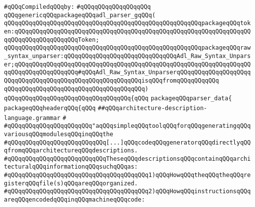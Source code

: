 \label{src/lib/compiler/back/low/tools/parser/architecture-description-language.grammar.pkg}
\newline
\verb|#qQQqCompiledqQQqby:|\newline
\verb|#qQQqqQQqqQQqqQQqqQQq|\newline
\newline
\verb|qQQqgenericqQQqpackageqQQqadl_parser_gqQQq(|\newline
\verb|qQQqqQQqqQQqqQQqqQQqqQQqqQQqqQQqqQQqqQQqqQQqqQQqqQQqqQQqpackageqQQqtoken:qQQqqQQqqQQqqQQqqQQqqQQqqQQqqQQqqQQqqQQqqQQqqQQqqQQqqQQqqQQqqQQqqQQqqQQqqQQqqQQqqQQqqQQqToken;|\newline
\verb|qQQqqQQqqQQqqQQqqQQqqQQqqQQqqQQqqQQqqQQqqQQqqQQqqQQqqQQqpackageqQQqraw_syntax_unparser:qQQqqQQqqQQqqQQqqQQqqQQqqQQqqQQqAdl_Raw_Syntax_Unparser;qQQqqQQqqQQqqQQqqQQqqQQqqQQqqQQqqQQqqQQqqQQqqQQqqQQqqQQqqQQqqQQqqQQqqQQqqQQqqQQqqQQqqQQq#qQQqAdl_Raw_Syntax_UnparserqQQqqQQqqQQqqQQqqQQqqQQqqQQqqQQqqQQqqQQqqQQqqQQqqQQqqQQqqQQqisqQQqfromqQQqqQQqqQQq|\newline
\verb|qQQqqQQqqQQqqQQqqQQqqQQqqQQqqQQqqQQqqQQq)|\newline
\verb|qQQqqQQqqQQqqQQqqQQqqQQqqQQqqQQqqQQq{qQQq|\newline
\verb|packageqQQqparser_data{|\newline
\verb|packageqQQqheaderqQQq{qQQq|\newline
\verb|##qQQqarchitecture-description-language.grammar|\newline
\verb|#|\newline
\verb|#qQQqqQQqqQQqqQQqqQQqqQQq"aqQQqsimpleqQQqtoolqQQqforqQQqgeneratingqQQqvariousqQQqmodulesqQQqinqQQqthe|\newline
\verb|#qQQqqQQqqQQqqQQqqQQqqQQqqQQq[...]qQQqcodeqQQqgeneratorqQQqdirectlyqQQqfromqQQqarchitectureqQQqdescriptions.|\newline
\verb|#qQQqqQQqqQQqqQQqqQQqqQQqqQQqTheseqQQqdescriptionsqQQqcontainqQQqarchitecturalqQQqinformationqQQqsuchqQQqas:|\newline
\verb|#qQQqqQQqqQQqqQQqqQQqqQQqqQQqqQQqqQQqqQQq1)qQQqHowqQQqtheqQQqtheqQQqregisterqQQqfile(s)qQQqareqQQqorganized.|\newline
\verb|#qQQqqQQqqQQqqQQqqQQqqQQqqQQqqQQqqQQqqQQq2)qQQqHowqQQqinstructionsqQQqareqQQqencodedqQQqinqQQqmachineqQQqcode:|\newline

